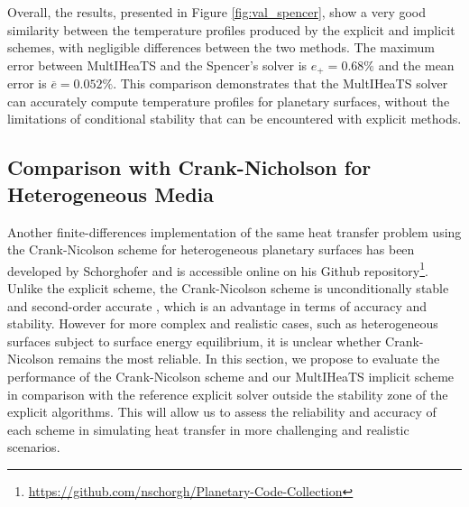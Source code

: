 \documentclass[sn-vancouver, Numbered]{sn-jnl}
\begin{document}

Overall, the results, presented in Figure \ref{fig:val_spencer},  show a very good similarity between the temperature profiles produced by the explicit and implicit schemes, with negligible differences between the two methods.
The maximum error between MultIHeaTS and the Spencer's solver is $e_+=0.68\%$ and the mean error is $\overline{e}=0.052\%$.
This comparison demonstrates that the MultIHeaTS solver can accurately compute temperature profiles for planetary surfaces, without the limitations of conditional stability that can be encountered with explicit methods.




\subsection{Comparison with Crank-Nicholson for Heterogeneous Media}

Another finite-differences implementation of the same heat transfer problem using the Crank-Nicolson scheme for heterogeneous planetary surfaces has been developed by Schorghofer \cite{Schorghofer2010} and is accessible online on his Github repository\footnote{\url{https://github.com/nschorgh/Planetary-Code-Collection}}. 
Unlike the explicit scheme, the Crank-Nicolson scheme is unconditionally stable and second-order accurate \cite{Mazumder2016}, which is an advantage in terms of accuracy and stability.   
However for more complex and realistic cases, such as heterogeneous surfaces subject to surface energy equilibrium,  it is unclear whether Crank-Nicolson remains the most reliable. 
In this section, we propose to evaluate the performance of the Crank-Nicolson scheme and our MultIHeaTS implicit scheme in comparison with the reference explicit solver outside the stability zone of the explicit algorithms. 
This will allow us to assess the reliability and accuracy of each scheme in simulating heat transfer in more challenging and realistic scenarios.
\end{document}
